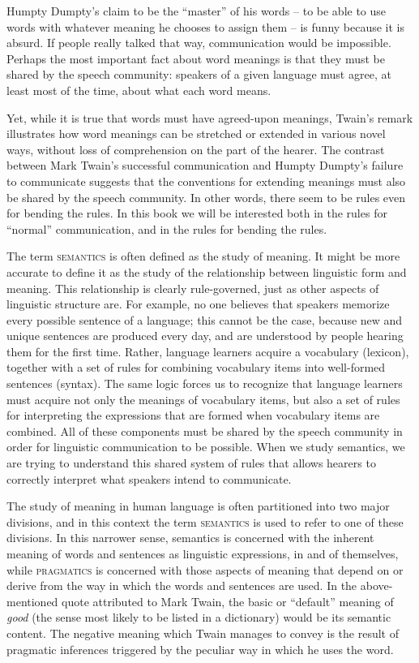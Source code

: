 Humpty Dumpty’s claim to be the “master” of his words – to be able to use words with whatever meaning he chooses to assign them – is funny because it is absurd. If people really talked that way, communication would be impossible. Perhaps the most important fact about word meanings is that they must be shared by the speech community: speakers of a given language must agree, at least most of the time, about what each word means.



Yet, while it is true that words must have agreed-upon meanings, Twain’s remark illustrates how word meanings can be stretched or extended in various novel ways, without loss of comprehension on the part of the hearer. The contrast between Mark Twain’s successful communication and Humpty Dumpty’s failure to communicate suggests that the conventions for extending meanings must also be shared by the speech community. In other words, there seem to be rules even for bending the rules. In this book we will be interested both in the rules for “normal” communication, and in the rules for bending the rules.



The term \textsc{semantics} is often defined as the study of meaning. It might be more accurate to define it as the study of the relationship between linguistic form and meaning. This relationship is clearly rule-governed, just as other aspects of linguistic structure are. For example, no one believes that speakers memorize every possible sentence of a language; this cannot be the case, because new and unique sentences are produced every day, and are understood by people hearing them for the first time. Rather, language learners acquire a vocabulary (lexicon), together with a set of rules for combining vocabulary items into well-formed sentences (syntax). The same logic forces us to recognize that language learners must acquire not only the meanings of vocabulary items, but also a set of rules for interpreting the expressions that are formed when vocabulary items are combined. All of these components must be shared by the speech community in order for linguistic communication to be possible. When we study semantics, we are trying to understand this shared system of rules that allows hearers to correctly interpret what speakers intend to communicate.


\largerpage
The study of meaning in human language is often partitioned into two major divisions, and in this context the term \textsc{semantics} is used to refer to one of these divisions. In this narrower sense, semantics is concerned with the inherent meaning of words and sentences as linguistic expressions, in and of themselves, while \textsc{pragmatics} is concerned with those aspects of meaning that depend on or derive from the way in which the words and sentences are used. In the above-mentioned quote attributed to Mark Twain, the basic or “default” meaning of \textit{good} (the sense most likely to be listed in a dictionary) would be its semantic content. The negative meaning which Twain manages to convey is the result of pragmatic inferences triggered by the peculiar way in which he uses the word.



